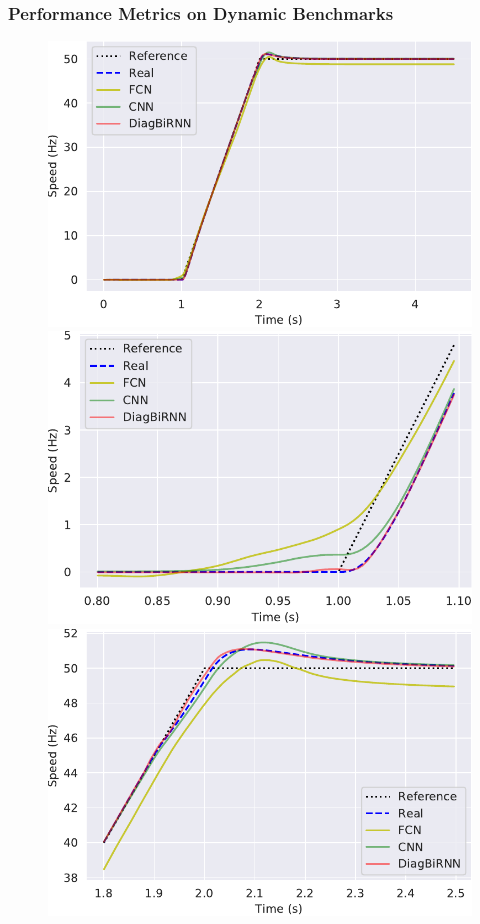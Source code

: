 \documentclass{beamer}
\begin{document}
\begin{frame}
\frametitle{Performance Metrics on Dynamic Benchmarks}

\begin{figure}
    \centering
    \includegraphics[scale=0.3]{images/bench1.pdf}
    \includegraphics[scale=0.3]{images/bench1_1st.pdf} \\
    \includegraphics[scale=0.3]{images/bench1_3rd.pdf}

\end{figure}
\end{frame}
\end{document}
